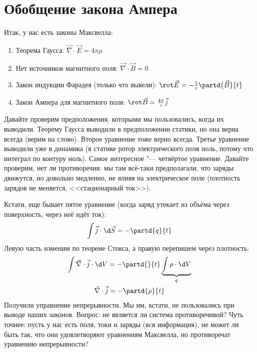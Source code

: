 
\section{Обобщение закона Ампера}
	Итак, у нас есть законы Максвелла:
	\begin{enumerate}
		\item
			Теорема Гаусса:
			$\vec \nabla \cdot \vec E = 4\pi\rho$
		\item
			Нет источников магнитного поля:
			$\vec \nabla \cdot \vec B = 0$
		\item
			Закон индукции Фарадея (только что вывели):
			$\rot \vec E = -\frac1c \partd{\vec B}{t}$
		\item
			Закон Ампера для магнитного поля:
			$\rot \vec B = \frac{4\pi}{c} \vec j$
	\end{enumerate}

	Давайте проверим предположения, которыми мы пользовались, когда их выводили.
	Теорему Гаусса выводили в предположении статики, но она верна всегда (верим на слово).
	Второе уравнение тоже верно всегда.
	Третье уравнение выводили уже в динамика (в статике ротор электрического поля ноль, потому что интеграл по контуру ноль).
	Самое интересное "--- четвёртое уравнение.
	Давайте проверим, нет ли противоречия: мы там всё-таки предполагали, что заряды движутся, но довольно медленно, не влияя на электрическое поле (плотность зарядов не меняется, <<стационарный ток>>).

	Кстати, еще бывает пятое уравнение (когда заряд утекает из объёма через поверхность, через неё идёт ток):
	\[
		\int \vec j \cdot \d \vec S = -\partd{q}{t}
	\]
	Левую часть изменим по теореме Стокса, а правую перепишем через плотность:
	\begin{gather*}
		\int \vec \nabla \cdot \vec j \cdot \d V = -\partd{}{t} \underbrace{\int \rho \cdot \d V}_{q} \\
		\vec \nabla \cdot \vec j = -\partd{\rho}{t} \\
	\end{gather*}
	Получили управнение непрерывности.
	Мы им, кстати, не пользовались при выводе наших законов.
	Вопрос: не является ли система противоречивой?
	Чуть точнее: пусть у нас есть поля, токи и заряды (вся информация), не может ли быть так, что они удовлетворяют уравнениям Максвелла, но противоречат уравнению непрерывности?


